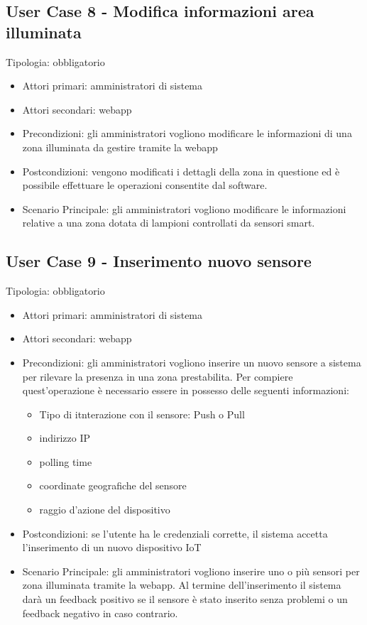 \documentclass[12pt]{article}
\begin{document}
\subsection{User Case 8 - Modifica informazioni area illuminata}
Tipologia: obbligatorio
\begin{itemize}
	\item Attori primari: amministratori di sistema
	\item Attori secondari: webapp
	\item Precondizioni: gli amministratori vogliono modificare le informazioni di una  zona illuminata da gestire tramite la webapp
	\item Postcondizioni: vengono modificati i dettagli della zona in questione ed è possibile effettuare le operazioni consentite dal software.
	\item Scenario Principale: gli amministratori vogliono modificare le informazioni relative a una zona dotata di lampioni controllati da sensori smart.
\end{itemize}

\subsection{User Case 9 - Inserimento nuovo sensore}
Tipologia: obbligatorio
\begin{itemize}
	\item Attori primari: amministratori di sistema
	\item Attori secondari: webapp
	\item Precondizioni: gli amministratori vogliono inserire un nuovo sensore a sistema per rilevare la presenza in una zona prestabilita. Per compiere quest'operazione è necessario essere in possesso delle seguenti informazioni: 
	\begin{itemize}
		\item Tipo di itnterazione con il sensore: Push o Pull
		\item indirizzo IP
		\item polling time
		\item coordinate geografiche del sensore
		\item raggio d'azione del dispositivo
	\end{itemize}
	\item Postcondizioni: se l'utente ha le credenziali corrette, il sistema accetta l'inserimento di un nuovo dispositivo IoT
	\item Scenario Principale: gli amministratori vogliono inserire uno o più sensori per zona illuminata tramite la webapp. 
	Al termine dell'inserimento il sistema darà un feedback positivo se il sensore è stato inserito senza problemi o un feedback negativo in caso contrario.
\end{itemize}
\end{document}
